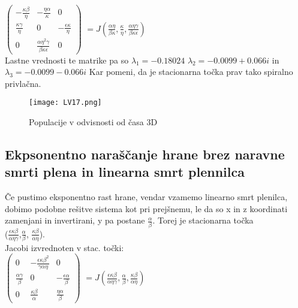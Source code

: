 \documentclass[11pt]{report}
\begin{document}
	\hspace{25mm}
	$\begin{pmatrix}
		-\frac{\kappa \beta}{\eta}& -\frac{\eta \alpha}{\kappa} & 0 \\
		\frac{\kappa \gamma}{\eta}&0  & -\frac{\epsilon \kappa}{\eta} \\ 
		0 & \frac{\alpha \eta^2\gamma}{\beta \kappa \epsilon} &  0
	\end{pmatrix}$
	$=J(\frac{\alpha \eta}{\beta \kappa},\frac{\kappa}{\eta}, \frac{\alpha \eta \gamma}{\beta \kappa \epsilon})$\\
	Lastne vrednosti te matrike pa so $\lambda_1 = - 0.18024$ $\lambda_2 = - 0.0099 + 0.066i $
	in $\lambda_3 = - 0.0099 - 0.066i $ Kar pomeni, da je stacionarna točka prav tako spiralno privlačna.
	\begin{figure}[!ht]
		\centering
		\hspace{-35mm}
		\vspace{-5mm}
		\begin{minipage}{0.8\textwidth}
			\centering
			\vspace{-5mm}
			\texttt{[image: LV17.png]}
			\hspace{-20mm}
			\vspace{-5mm}
			\caption{Populacije v odvisnosti od časa 3D}
		\end{minipage}
	\end{figure}
	\newpage
	\vspace{-12mm}
	\subsection{Ekpsonentno naraščanje hrane brez naravne smrti plena in linearna smrt plennilca}
	Če pustimo eksponentno rast hrane, vendar vzamemo linearno smrt plenilca, dobimo podobne rešitve sistema kot pri prejšnemu, le da so x in z koordinati zamenjani in invertirani, y pa postane $\frac{\alpha}{\beta}$. Torej je stacionarna točka \\($\frac{\epsilon \kappa \beta}{\alpha \eta \gamma}$,$\frac{\alpha}{\beta}$, $\frac{\kappa \beta}{\alpha \eta }$).\\
	Jacobi izvrednoten v stac. točki:\\
	
		\hspace{25mm}
	$\begin{pmatrix}
		0 & -\frac{\epsilon \kappa \beta^2}{\gamma \alpha \eta} & 0 \\
		\frac{\alpha \gamma}{\beta}&0  & -\frac{\epsilon \alpha}{\beta} \\ 
		0 & \frac{\kappa \beta}{\alpha} &  \frac{\eta \alpha}{\beta}
	\end{pmatrix}$
	$=J(\frac{\epsilon \kappa \beta}{\alpha \eta \gamma},\frac{\alpha}{\beta}, \frac{\kappa \beta}{\alpha \eta })$\\
	
\end{document}
